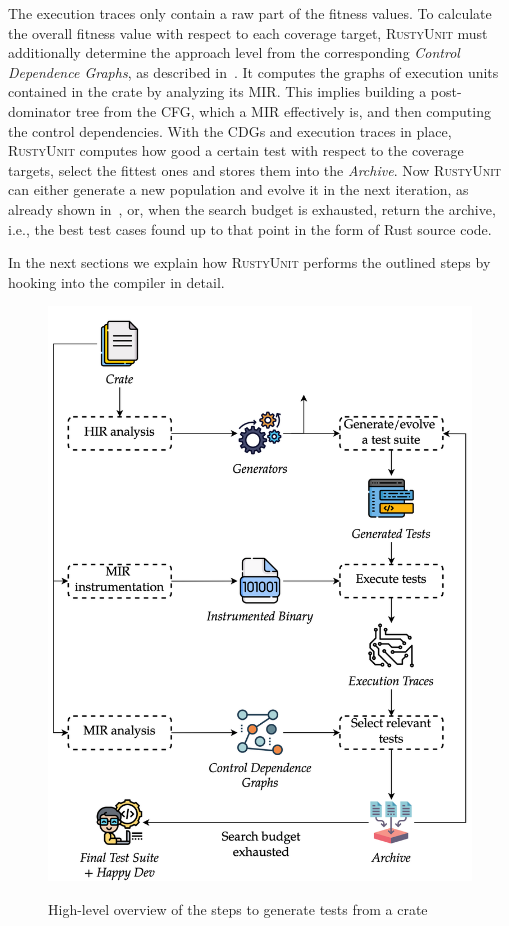 \documentclass[paper=a4,%
  twoside,%
  BCOR4mm,%
  abstract=true,%
  toc=bibliography,%
  chapterprefix=true,%
  toc=bibliographynumbered,%
  open=right,%
  english,%
  pagesize=pdftex]{scrreprt}
\newcommand{\tech}{\textsc{RustyUnit}\xspace}
\newcommand{\mir}{\ac{MIR}\xspace}
\newcommand{\cfg}{\ac{CFG}\xspace}
\newcommand{\cdgs}{\acp{CDG}\xspace}
\begin{document}
The execution traces only contain a raw part of the fitness values. To calculate the overall fitness value with respect to each coverage target, \tech must additionally determine the approach level from the corresponding \emph{Control Dependence Graphs}, as described in~. It computes the graphs of execution units contained in the crate by analyzing its \mir. This implies building a post-dominator tree from the \cfg, which a \mir effectively is, and then computing the control dependencies. With the \cdgs and execution traces in place, \tech computes how good a certain test with respect to the coverage targets, select the fittest ones and stores them into the \emph{Archive}. Now \tech can either generate a new population and evolve it in the next iteration, as already shown in~, or, when the search budget is exhausted, return the archive, i.e., the best test cases found up to that point in the form of Rust source code. 

In the next sections we explain how \tech performs the outlined steps by hooking into the compiler in detail.

\begin{figure}[h!]
\caption{High-level overview of the steps to generate tests from a crate}
\centering
\includegraphics[width=\textwidth]{overview/overview-enhanced}
\label{fig:rustyunit-overview}
\end{figure}
\end{document}
